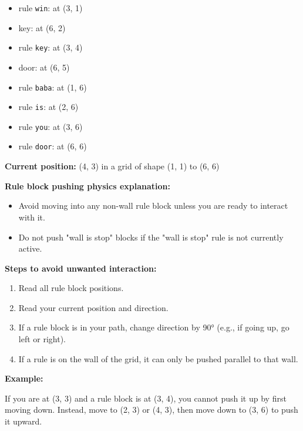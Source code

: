 \begin{GreenBox}
\begin{itemize}
		\item rule \texttt{win}: at (3, 1)

		\item key: at (6, 2)

		\item rule \texttt{key}: at (3, 4)

		\item door: at (6, 5)

		\item rule \texttt{baba}: at (1, 6)

		\item rule \texttt{is}: at (2, 6)

		\item rule \texttt{you}: at (3, 6)

		\item rule \texttt{door}: at (6, 6)
	\end{itemize}

	\textbf{Current position:} (4, 3) in a grid of shape (1, 1) to (6, 6)

	\textbf{Rule block pushing physics explanation:}

	\begin{itemize}
		\item Avoid moving into any non-wall rule block unless you are ready to interact
			with it.

		\item Do not push "wall is stop" blocks if the "wall is stop" rule is not currently
			active.
	\end{itemize}

	\textbf{Steps to avoid unwanted interaction:}
	\begin{enumerate}
		\item Read all rule block positions.

		\item Read your current position and direction.

		\item If a rule block is in your path, change direction by 90° (e.g., if going
			up, go left or right).

		\item If a rule is on the wall of the grid, it can only be pushed parallel
			to that wall.
	\end{enumerate}

	\textbf{Example:}

	If you are at (3, 3) and a rule block is at (3, 4), you cannot push it up by first
	moving down. Instead, move to (2, 3) or (4, 3), then move down to (3, 6) to push
	it upward.


\end{GreenBox}
